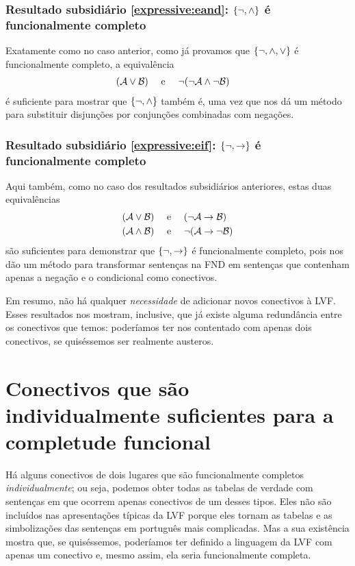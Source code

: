 \subsubsection{Resultado subsidiário \ref{expressive:eand}: $\{\neg, \wedge \}$ é funcionalmente completo}
Exatamente como no caso anterior, como já provamos que $\{ \neg, \wedge, \vee\}$ é funcionalmente completo, a equivalência 
		\begin{align*}
		(\mathcal{A} \vee \mathcal{B}) & \text{\quad \ e \quad}\neg(\neg \mathcal{A} \wedge\neg \mathcal{B})
		\end{align*}
é suficiente para mostrar que $\{ \neg, \wedge\}$ também é, uma vez que nos dá um método para substituir disjunções por conjunções combinadas com negações.

\subsubsection{Resultado subsidiário \ref{expressive:eif}: $\{\neg, \rightarrow \}$ é funcionalmente completo}
Aqui também, como no caso dos resultados subsidiários anteriores, estas duas equivalências 
		\begin{align*}
		(\mathcal{A} \vee \mathcal{B}) &\text{\quad \ e \quad} (\neg \mathcal{A} \rightarrow \mathcal{B})\\
		(\mathcal{A} \wedge \mathcal{B}) &\text{\quad \ e \quad} \neg(\mathcal{A} \rightarrow \neg\mathcal{B})
		\end{align*}
são suficientes para demonstrar que $\{ \neg, \rightarrow\}$ é funcionalmente completo, pois nos dão um método para transformar sentenças na FND em sentenças que contenham apenas a negação e o condicional como conectivos.

Em resumo, não há qualquer \emph{necessidade} de adicionar novos conectivos à LVF.
Esses resultados nos mostram, inclusive, que já existe alguma redundância entre os conectivos que temos: poderíamos ter nos contentado com apenas dois conectivos, se quiséssemos ser realmente austeros.


\section{Conectivos que são individualmente suficientes para a completude funcional}

Há alguns conectivos de dois lugares que são funcionalmente completos \emph{individualmente}; ou seja, podemos obter todas as tabelas de verdade com sentenças em que ocorrem apenas conectivos de um desses tipos.
Eles não são incluídos nas apresentações típicas da LVF porque eles tornam as tabelas e as simbolizações das sentenças em português mais complicadas.
Mas a sua existência mostra que, se quiséssemos, poderíamos ter definido a linguagem da LVF com apenas um conectivo e, mesmo assim, ela seria funcionalmente completa.

